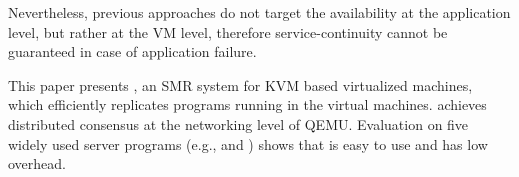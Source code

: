 
Nevertheless, previous approaches do not target the availability at the application 
level, but rather at the VM level, therefore service-continuity cannot be 
guaranteed in case of application failure.

This paper presents \xxx, an SMR system for KVM based virtualized machines, 
which efficiently replicates programs running in the virtual machines. 
\xxx achieves distributed consensus at the networking level of QEMU. 
Evaluation on five widely used server programs (e.g., \mysql and \redis) shows 
that \xxx is easy to use and has low overhead.
